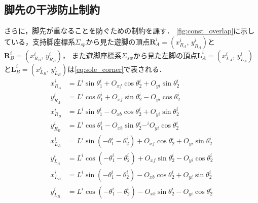 \documentclass[autodetect-engine,dvipdfmx-if-dvi,ja=standard,a4j,jbase=11pt,magstyle=nomag*]{bxjsreport}
\begin{document}
\subsection{脚先の干渉防止制約}
さらに，脚先が重なることを防ぐための制約を課す．
\cref{fig:const_overlap}に示している，支持脚座標系$\Sigma_{sp}$から見た遊脚の頂点$\bm{R}_A^i = (x_{R_A}^i ,\, y_{R_A}^i)$と$\bm{R}_B^i = (x_{R_B}^i ,\, y_{R_B}^i)$，
また遊脚座標系$\Sigma_{sw}$から見た左脚の頂点$\bm{L}_A^i = (x_{L_A}^i ,\, y_{L_A}^i)$と$\bm{L}_B^i = (x_{L_B}^i ,\, y_{L_B}^i)$は\cref{eq:sole_corner}で表される．
\begin{equation}
\label{eq:sole_corner}
    \begin{aligned}
        x_{R_A}^i & = L^i \sin \theta_1^i + O_{xf} \cos \theta_2^i + O_{yi} \sin \theta_2^i \\
        y_{R_A}^i & = L^i \cos \theta_1^i + O_{xf} \sin \theta_2^i - O_{yi} \cos \theta_2^i \\
        x_{R_B}^i & = L^i \sin \theta_1^i - O_{xb} \cos \theta_2^i + O_{yi} \sin \theta_2^i \\
        y_{R_B}^i & = L^i \cos \theta_1^i - O_{xb} \sin \theta_2^i - ^iO_{yi} \cos \theta_2^i \\
        x_{L_A}^i & = L^i \sin \left( - \theta_1^i - \theta_2^i \right) + O_{xf} \cos \theta_2^i + O_{yi} \sin \theta_2^i \\
        y_{L_A}^i & = L^i \cos \left( - \theta_1^i - \theta_2^i \right) + O_{xf} \sin \theta_2^i - O_{yi} \cos \theta_2^i \\
        x_{L_B}^i & = L^i \sin \left( - \theta_1^i - \theta_2^i \right) - O_{xb} \cos \theta_2^i + O_{yi} \sin \theta_2^i \\
        y_{L_B}^i & = L^i \cos \left( - \theta_1^i - \theta_2^i \right) - O_{xb} \sin \theta_2^i - O_{yi} \cos \theta_2^i 
    \end{aligned}
\end{equation}
%
\end{document}

